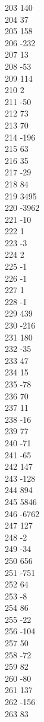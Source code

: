 { 203	140 \\
 204	37 \\
 205	158 \\
 206	-232 \\
 207	13 \\
 208	-53 \\
 209	114 \\
 210	2 \\
 211	-50 \\
 212	73 \\
 213	70 \\
 214	-196 \\
 215	63 \\
 216	35 \\
 217	-29 \\
 218	84 \\
 219	3495 \\
 220	-3962 \\
 221	-10 \\
 222	1 \\
 223	-3 \\
 224	2 \\
 225	-1 \\
 226	-1 \\
 227	1 \\
 228	-1 \\
 229	439 \\
 230	-216 \\
 231	180 \\
 232	-35 \\
 233	47 \\
 234	15 \\
 235	-78 \\
 236	70 \\
 237	11 \\
 238	-16 \\
 239	77 \\
 240	-71 \\
 241	-65 \\
 242	147 \\
 243	-128 \\
 244	894 \\
 245	5846 \\
 246	-6762 \\
 247	127 \\
 248	-2 \\
 249	-34 \\
 250	656 \\
 251	-751 \\
 252	64 \\
 253	-8 \\
 254	86 \\
 255	-22 \\
 256	-104 \\
 257	50 \\
 258	-72 \\
 259	82 \\
 260	-80 \\
 261	137 \\
 262	-156 \\
 263	83 \\
}
